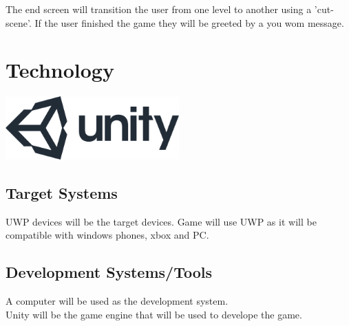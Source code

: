 \documentclass[a4paper]{scrreprt}
\begin{document}
    The end screen will transition the user from one level to another using a 'cut-scene'. If the user finished the game they will be greeted by a you wom message.


    \chapter{Technology}

    \includegraphics[width=0.50\textwidth]{Unity}

    \section{Target Systems}

    UWP devices will be the target devices. Game will use UWP as it will be compatible with windows phones, xbox and PC.

    \section{Development Systems/Tools}

    A computer will be used as the development system. \\
    Unity will be the game engine that will be used to develope the game. \\
\end{document}
